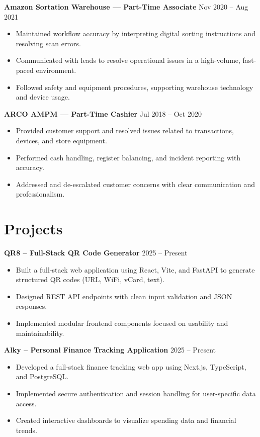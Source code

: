 \documentclass[a4paper,9.5pt]{article}
\newcommand{\dateright}[1]{\hfill {\small\textnormal{#1}}}
\begin{document}
\textbf{Amazon Sortation Warehouse — Part-Time Associate} \dateright{Nov 2020 – Aug 2021}
\begin{itemize}
  \item Maintained workflow accuracy by interpreting digital sorting instructions and resolving scan errors.
  \item Communicated with leads to resolve operational issues in a high-volume, fast-paced environment.
  \item Followed safety and equipment procedures, supporting warehouse technology and device usage.
\end{itemize}

\textbf{ARCO AMPM — Part-Time Cashier} \dateright{Jul 2018 – Oct 2020}
\begin{itemize}
  \item Provided customer support and resolved issues related to transactions, devices, and store equipment.
  \item Performed cash handling, register balancing, and incident reporting with accuracy.
  \item Addressed and de-escalated customer concerns with clear communication and professionalism.
\end{itemize}

\section*{Projects}

\textbf{QR8 – Full-Stack QR Code Generator} \dateright{2025 – Present}
\begin{itemize}
  \item Built a full-stack web application using React, Vite, and FastAPI to generate structured QR codes (URL, WiFi, vCard, text).
  \item Designed REST API endpoints with clean input validation and JSON responses.
  \item Implemented modular frontend components focused on usability and maintainability.
\end{itemize}

\textbf{Alky – Personal Finance Tracking Application} \dateright{2025 – Present}
\begin{itemize}
  \item Developed a full-stack finance tracking web app using Next.js, TypeScript, and PostgreSQL.
  \item Implemented secure authentication and session handling for user-specific data access.
  \item Created interactive dashboards to visualize spending data and financial trends.
\end{itemize}
\end{document}
